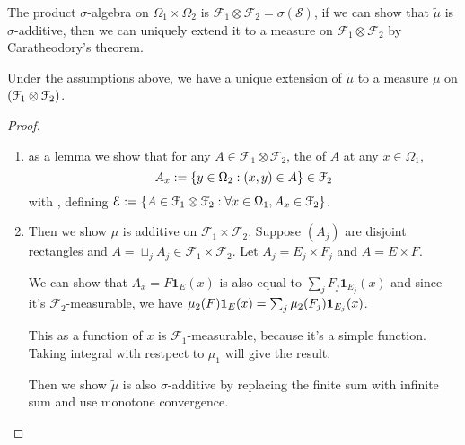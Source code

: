 The product \(\sigma\)-algebra on \(\Omega_{1}\times \Omega_{2}\) is \(\mathcal{F}_{1} \otimes \mathcal{F}_{2} = \sigma(\mathcal{S})\), if we can show that \(\tilde{\mu}\) is \(\sigma\)-additive, then we can uniquely extend it to a measure on \(\mathcal{F}_{1} \otimes \mathcal{F}_{2}\) by Caratheodory's theorem. 

\begin{thm}
    Under the assumptions above, we have a unique extension of \(\tilde{\mu}\) to a measure \(\mu\) on \(\pqty{\mathcal{F}_{1} \otimes \mathcal{F}_{2} }\). 
\end{thm}
\begin{proof}
    \begin{enumerate}
        \item as a lemma we show that for any \(A \in \mathcal{F}_{1}\otimes \mathcal{F}_{2} \), the  of \(A\) at any \(x \in \Omega_{1}\), 
        \begin{equation*}
            A_{x}:= \Bqty{y\in \Omega_{2}: (x,y) \in A}  \in \mathcal{F}_{2}
        \end{equation*}
        with , defining \(\mathcal{E} := \Bqty{A \in \mathcal{F}_{1} \otimes \mathcal{F}_{2} : \forall x \in\Omega_{1} , A_{x} \in \mathcal{F}_{2}}\).
        
        \item
        Then we show \(\mu\) is additive on \(\mathcal{F}_{1} \times \mathcal{F}_{2}\). Suppose \((A_{j})\) are disjoint rectangles and \( A = \sqcup_{j} A_{j} \in \mathcal{F}_{1}\times \mathcal{F}_{2}\). Let \(A_{j} = E_{j} \times F_{j}\) and \(A = E\times F\).
        
        We can show that \(A_{x} = F \mathbf{1}_{E}(x)  \) is also equal to \(\sum_{j} F_{j} \mathbf{1}_{E_{j}}(x)\) and since it's \(\mathcal{F}_{2}\)-measurable, we have \(\mu_{2}(F)\mathbf{1}_{E}(x) = \sum_{j} \mu_{2}\pqty{F_{j}} \mathbf{1}_{E_{j}}(x)\).

    This as a function of \(x\) is \(\mathcal{F}_{1}\)-measurable, because it's a simple function. Taking integral with restpect to \(\mu_{1}\) will give the result.
     
    Then we show \(\tilde{\mu}\) is also \(\sigma\)-additive by replacing the finite sum with infinite sum and use monotone convergence.
    \end{enumerate}
\end{proof}



